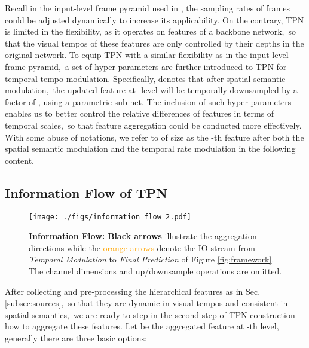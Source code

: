 \documentclass[10pt,twocolumn,letterpaper]{article}
\begin{document}
Recall in the input-level frame pyramid used in \cite{slowfast}, the sampling rates of frames could be adjusted dynamically to increase its applicability.
On the contrary, TPN is limited in the flexibility, as it operates on features of a backbone network,\
so that the visual tempos of these features are only controlled by their depths in the original network.
To equip TPN with a similar flexibility as in the input-level frame pyramid,\
a set of hyper-parameters  are further introduced to TPN for temporal tempo modulation.
Specifically,  denotes that after spatial semantic modulation,\
the updated feature at -level will be temporally downsampled by a factor of , using a parametric sub-net.
The inclusion of such hyper-parameters enables us to better control the relative differences of features in terms of temporal scales,\
so that feature aggregation could be conducted more effectively.
With some abuse of notations, we refer to  of size  as the -th feature after both the spatial semantic modulation and the temporal rate modulation in the following content.


\subsection{Information Flow of TPN}\label{subsec:infoflow}

\begin{figure}[t]
    \centering
    \texttt{[image: ./figs/information\_flow\_2.pdf]}
    \caption{
        \textbf{Information Flow:}
        \textbf{Black arrows} illustrate the aggregation directions while the \textcolor{orange}{orange arrows} denote the IO stream from \emph{Temporal Modulation} to \emph{Final Prediction} of Figure \ref{fig:framework}.
        The channel dimensions and up/downsample operations are omitted.
    }
    \label{fig:flow}
    \end{figure}

After collecting and pre-processing the hierarchical features as in Sec.\ref{subsec:sources},\
so that they are dynamic in visual tempos and consistent in spatial semantics,\
we are ready to step in the second step of TPN construction -- how to aggregate these features.
Let  be the aggregated feature at -th level, generally there are three basic options:
 
\end{document}
